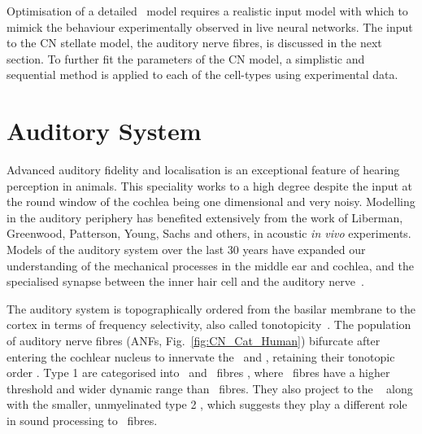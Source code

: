 
Optimisation of a detailed \BNN~model requires a realistic input model with
which to mimick the behaviour experimentally observed in live neural
networks. The input to the CN stellate model, the auditory nerve fibres, is
discussed in the next section. To further fit the parameters of the CN model, a
simplistic and sequential method is applied to each of the cell-types using
experimental data.



\section{Auditory System    \label{sec:CN:auditory-model}}

Advanced auditory fidelity and localisation is an exceptional feature of hearing
perception in animals.  This speciality works to a high degree despite the input
at the round window of the cochlea being one dimensional and very noisy.
Modelling in the auditory periphery has benefited extensively from the work of
Liberman, Greenwood, Patterson, Young, Sachs and others, in acoustic \textit{in
  vivo} experiments.  Models of the auditory system over the last 30 years have
expanded our understanding of the mechanical processes in the middle ear and
cochlea, and the specialised synapse between the inner hair cell and the
auditory nerve~\citep{DavisVoigt:1991,Carney:1993,MeddisHewittEtAl:1990}.


The auditory system is topographically ordered from the basilar membrane to the
cortex in terms of frequency selectivity, also called
tonotopicity~\citep{YoungOertel:2004}.  The population of auditory nerve fibres
(ANFs, Fig.~\ref{fig:CN_Cat_Human}) bifurcate after entering the cochlear
nucleus to innervate the \VCN~and \DCN, retaining their tonotopic order
\citep{Lorente:1981,Liberman:1982,Liberman:1993}.  Type 1 \ANFs are categorised
into {\HSR}~and {\LSR}~fibres \citep{Liberman:1978}, where \LSR~fibres have a
higher threshold and wider dynamic range than \HSR~fibres.  They also project to
the \GCD~\citep{RyugoParks:2003, RyugoHaenggeliEtAl:2003} along with the
smaller, unmyelinated type 2 \ANFs, which suggests they play a different role in
sound processing to \HSR~fibres.

